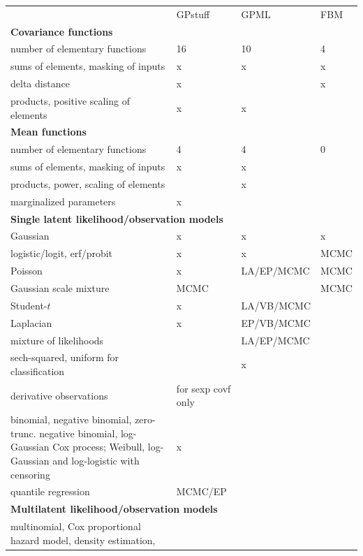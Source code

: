 \documentclass[twoside,11pt]{article}
\begin{document}
\begin{table}
  \scriptsize
  \begin{tabular}{p{9.5cm}p{2.3cm}p{2.1cm}p{0.9cm}}
    & GPstuff & GPML & FBM \\
    \textbf{Covariance functions} &  &  & \\
    \hline
    number of elementary functions & 16 & 10 & 4 \\
    sums of elements, masking of inputs  & x & x & x \\
    delta distance & x & & x \\
    products, positive scaling of elements & x & x &  \\    
    \multicolumn{4}{l}{\textbf{Mean functions}} \\
    \hline
    number of elementary functions & 4 & 4 & 0 \\
    sums of elements, masking of inputs & x & x & \\
    products, power, scaling of elements &  & x &  \\
    marginalized parameters  & x &  &  \\
    \multicolumn{4}{l}{\textbf{Single latent likelihood/observation models}}  \\
    \hline
    Gaussian & x & x & x \\
    logistic/logit, erf/probit & x & x & MCMC\\
    Poisson & x & LA/EP/MCMC & MCMC \\
    Gaussian scale mixture & MCMC &  & MCMC\\
    Student-$t$ & x & LA/VB/MCMC & \\
    Laplacian & x & EP/VB/MCMC & \\
    mixture of likelihoods &   &  LA/EP/MCMC  & \\
    sech-squared, uniform for classification &  & x & \\
    derivative observations & for sexp covf only &  & \\
    \hangindent=0.3cm binomial, negative binomial, zero-trunc. negative binomial, 
    log-Gaussian Cox process; Weibull, log-Gaussian and log-logistic with censoring & x &  & \\
    quantile regression & MCMC/EP & & \\
    \multicolumn{4}{l}{\textbf{Multilatent likelihood/observation models}} \\
    \hline
    \hangindent=0.3cm multinomial, Cox proportional hazard model, density estimation,

\end{tabular}
\end{table}
\end{document}
